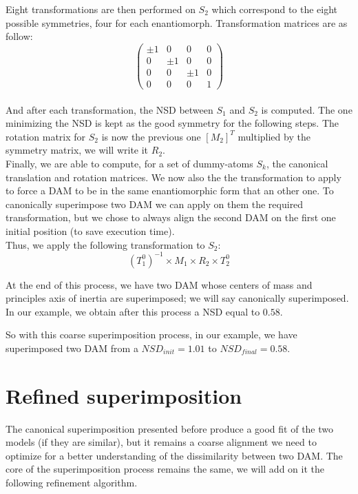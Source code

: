 \documentclass[a4paper, 11pt]{report}
\begin{document}
Eight transformations are then performed on $S_{2}$ which correspond 
to the eight possible symmetries, four for each enantiomorph. 
Transformation matrices are as follow:
\[
\begin{pmatrix}
 \pm 1 & 0 & 0 & 0 \\
 0 & \pm 1 & 0 & 0 \\
 0 & 0 & \pm 1 & 0 \\
 0 & 0 & 0 & 1
\end{pmatrix}
\]\\
And after each transformation, the NSD between $S_{1}$ and $S_{2}$ is 
computed. 
The one minimizing the NSD is kept as the good symmetry for the 
following steps. 
The rotation matrix for $S_{2}$ is now the previous one $[M_{2}]^T$ 
multiplied by the symmetry matrix, we will write it $R_{2}$.\\

Finally, we are able to compute, for a set of dummy-atoms $S_{k}$, the 
canonical translation and rotation matrices. 
We now also the the transformation to apply to force a DAM to be in 
the same enantiomorphic form that an other one. 
To canonically superimpose two DAM we can apply on them the required 
transformation, but we chose to always align the second DAM on the 
first one initial position (to save execution time).\\
Thus, we apply the following transformation to $S_{2}$:
\[(T_{1}^0)^{-1} \times M_{1} \times R_{2} \times T_{2}^0\]

At the end of this process, we have two DAM whose centers of mass and 
principles axis of inertia are superimposed; we will say canonically 
superimposed. 
In our example, we obtain after this process a NSD equal to $0.58$.

So with this coarse superimposition process, in our example, we have 
superimposed two DAM from a $NSD_{init} = 1.01$ to $NSD_{final} = 
0.58$. 

\section{Refined superimposition}

The canonical superimposition presented before produce a good fit of 
the two models (if they are similar), but it remains a coarse 
alignment we need to optimize for a better understanding of the 
dissimilarity between two DAM. 
The core of the superimposition process remains the same, we will add 
on it the following refinement algorithm.\\
 
\end{document}
